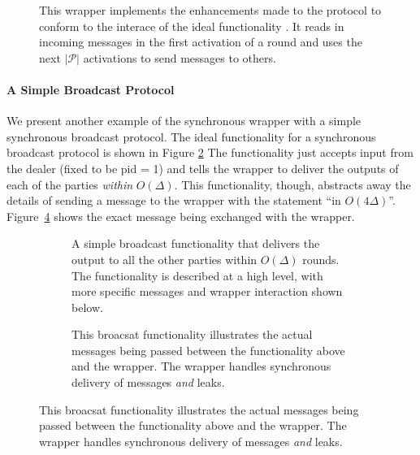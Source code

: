 \begin{figure}
	
	\caption{This wrapper implements the enhancements made to the protocol to conform to the interace of the ideal functionality \Fbc. It reads in incoming messages in the first activation of a round and uses the next $|\mathcal{P}|$ activations to send messages to others.}
	\label{fig:wrapper:synchronous}
\end{figure}

\paragraph{A Simple Broadcast Protocol}
We present another example of the synchronous wrapper with a simple synchronous broadcast protocol.
The ideal functionality for a synchronous broadcast protocol is shown in Figure \ref{fig:functionality:broadcast_import}
The functionality just accepts input from the dealer (fixed to be pid = 1) and tells the wrapper to deliver the outputs of each of the parties \emph{within} $O(\Delta)$.
This functionality, though, abstracts away the details of sending a message to the wrapper with the statement ``in $O(4\Delta)$''.
Figure~\ref{fig:functionality:broadcast_import_real} shows the exact message being exchanged with the wrapper.

\begin{figure}
\begin{subfigure}{\textwidth}
	
	\caption{A simple broadcast functionality that delivers the output to all the other parties within $O(\Delta)$ rounds. The functionality is described at a high level, with more specific messages and wrapper interaction shown below.}
	\label{fig:functionality:broadcast_import}
\end{subfigure}
\newline
\begin{subfigure}{\textwidth}
	
	\caption{This broacsat functionality illustrates the actual messages being passed between the functionality above and the wrapper. The wrapper handles synchronous delivery of messages {\em and} leaks.}
	\label{fig:functionality:broadcast_import_real}
\end{subfigure}
\end{figure}

